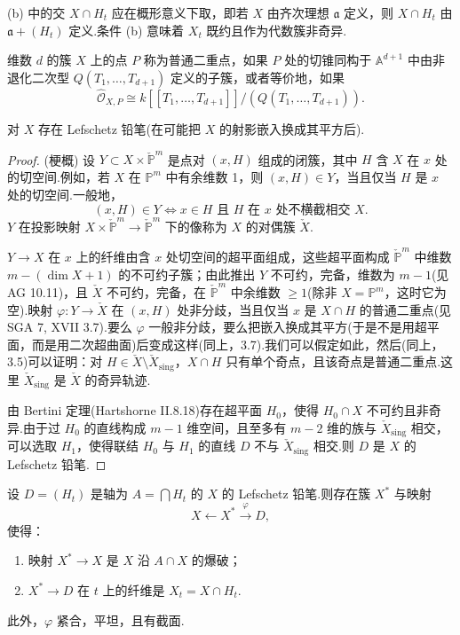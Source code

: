(b) 中的交 $X \cap H_t$ 应在概形意义下取，即若 $X$ 由齐次理想 $\mathfrak{a}$ 定义，则 $X \cap H_t$ 由 $\mathfrak{a} + (H_t)$ 定义.条件 (b) 意味着 $X_t$ 既约且作为代数簇非奇异.

维数 $d$ 的簇 $X$ 上的点 $P$ 称为普通二重点，如果 $P$ 处的切锥同构于 $\mathbb{A}^{d+1}$ 中由非退化二次型 $Q(T_1, \ldots, T_{d+1})$ 定义的子簇，或者等价地，如果
\[
\widehat{\mathcal{O}}_{X, P} \cong k[[T_1, \ldots, T_{d+1}]]/(Q(T_1, \ldots, T_{d+1})).
\]

\begin{theorem}\label{thm:31.2}
对 $X$ 存在 Lefschetz 铅笔(在可能把 $X$ 的射影嵌入换成其平方后).
\end{theorem}

\begin{proof}
(梗概) 设 $Y \subset X \times \check{\mathbb{P}}^{m}$ 是点对 $(x, H)$ 组成的闭簇，其中 $H$ 含 $X$ 在 $x$ 处的切空间.例如，若 $X$ 在 $\mathbb{P}^{m}$ 中有余维数 1，则 $(x, H) \in Y$，当且仅当 $H$ 是 $x$ 处的切空间.一般地，
\[
(x, H) \in Y \Longleftrightarrow x \in H \text{ 且 } H \text{ 在 } x \text{ 处不横截相交 } X.
\]
$Y$ 在投影映射 $X \times \check{\mathbb{P}}^{m} \to \check{\mathbb{P}}^{m}$ 下的像称为 $X$ 的对偶簇 $\check{X}$.

$Y \to X$ 在 $x$ 上的纤维由含 $x$ 处切空间的超平面组成，这些超平面构成 $\check{\mathbb{P}}^{m}$ 中维数 $m - (\dim X + 1)$ 的不可约子簇；由此推出 $Y$ 不可约，完备，维数为 $m - 1$(见 AG 10.11)，且 $\check{X}$ 不可约，完备，在 $\check{\mathbb{P}}^{m}$ 中余维数 $\geq 1$(除非 $X = \mathbb{P}^{m}$，这时它为空).映射 $\varphi \colon Y \to \check{X}$ 在 $(x, H)$ 处非分歧，当且仅当 $x$ 是 $X \cap H$ 的普通二重点(见 SGA 7, XVII 3.7).要么 $\varphi$ 一般非分歧，要么把嵌入换成其平方(于是不是用超平面，而是用二次超曲面)后变成这样(同上，3.7).我们可以假定如此，然后(同上，3.5)可以证明：对 $H \in \check{X} \setminus \check{X}_{\mathrm{sing}}$，$X \cap H$ 只有单个奇点，且该奇点是普通二重点.这里 $\check{X}_{\mathrm{sing}}$ 是 $\check{X}$ 的奇异轨迹.

由 Bertini 定理(Hartshorne II.8.18)存在超平面 $H_0$，使得 $H_0 \cap X$ 不可约且非奇异.由于过 $H_0$ 的直线构成 $m - 1$ 维空间，且至多有 $m - 2$ 维的族与 $\check{X}_{\mathrm{sing}}$ 相交，可以选取 $H_1$，使得联结 $H_0$ 与 $H_1$ 的直线 $D$ 不与 $\check{X}_{\mathrm{sing}}$ 相交.则 $D$ 是 $X$ 的 Lefschetz 铅笔.
\end{proof}

\begin{theorem}\label{thm:31.3}
设 $D = (H_t)$ 是轴为 $A = \bigcap H_t$ 的 $X$ 的 Lefschetz 铅笔.则存在簇 $X^{*}$ 与映射
\[
X \leftarrow X^{*} \xrightarrow{\varphi} D,
\]
使得：
\begin{enumerate}
  \item 映射 $X^{*} \to X$ 是 $X$ 沿 $A \cap X$ 的爆破；
  \item $X^{*} \to D$ 在 $t$ 上的纤维是 $X_t = X \cap H_t$.
\end{enumerate}
此外，$\varphi$ 紧合，平坦，且有截面.
\end{theorem}

